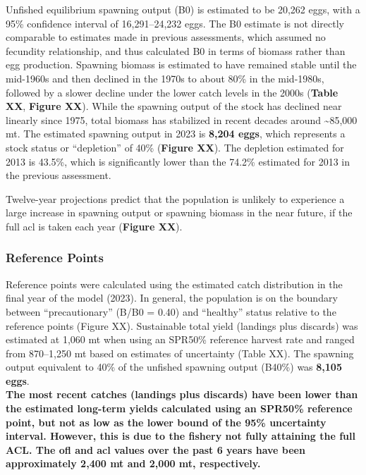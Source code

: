\documentclass[11pt,
  english,
  letterpaper,
]{article}
\begin{document}
Unfished equilibrium spawning output (B0) is estimated to be 20,262 eggs, with a 95\% confidence interval of 16,291--24,232 eggs. The B0 estimate is not directly comparable to estimates made in previous assessments, which assumed no fecundity relationship, and thus calculated B0 in terms of biomass rather than egg production. Spawning biomass is estimated to have remained stable until the mid-1960s and then declined in the 1970s to about 80\% in the mid-1980s, followed by a slower decline under the lower catch levels in the 2000s (\textbf{Table XX}, \textbf{Figure XX}). While the spawning output of the stock has declined near linearly since 1975, total biomass has stabilized in recent decades around \textasciitilde85,000 mt. The estimated spawning output in 2023 is \textbf{8,204 eggs}, which represents a stock status or ``depletion'' of 40\% (\textbf{Figure XX}). The depletion estimated for 2013 is 43.5\%, which is significantly lower than the 74.2\% estimated for 2013 in the previous assessment.

Twelve-year projections predict that the population is unlikely to experience a large increase in spawning output or spawning biomass in the near future, if the full \gls{acl} is taken each year (\textbf{Figure XX}).

\hypertarget{reference-points-1}{%
\subsubsection{Reference Points}\label{reference-points-1}}

Reference points were calculated using the estimated catch distribution in the final year of the model (2023). In general, the population is on the boundary between ``precautionary'' (B/B0 = 0.40) and ``healthy'' status relative to the reference points (Figure XX). Sustainable total yield (landings plus discards) was estimated at 1,060 mt when using an SPR50\% reference harvest rate and ranged from 870--1,250 mt based on estimates of uncertainty (Table XX). The spawning output equivalent to 40\% of the unfished spawning output (B40\%) was \textbf{8,105 eggs}.\\
\textbf{The most recent catches (landings plus discards) have been lower than the estimated long-term yields calculated using an SPR50\% reference point, but not as low as the lower bound of the 95\% uncertainty interval. However, this is due to the fishery not fully attaining the full ACL. The \gls{ofl} and \gls{acl} values over the past 6 years have been approximately 2,400 mt and 2,000 mt, respectively.}
\end{document}
